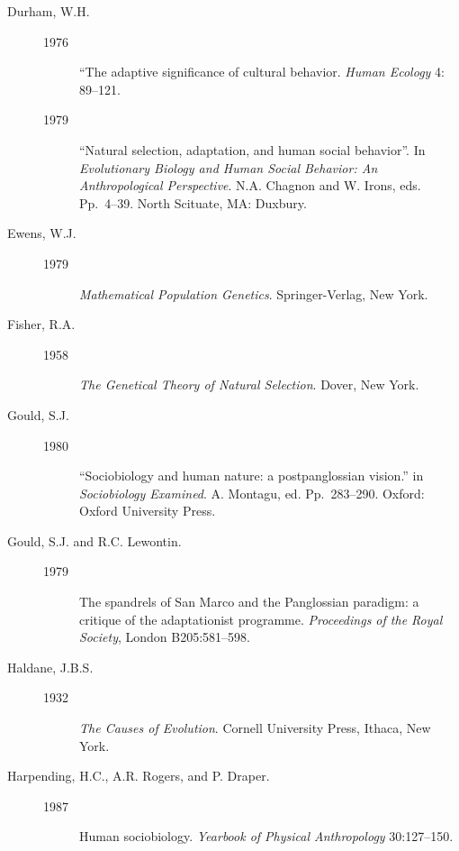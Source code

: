 \documentclass[11pt]{article}
\begin{document}
\begin{description}
\item[Durham, W.H.]
\mbox{}\begin{description}
\item[1976] ``The adaptive significance of cultural behavior.
\emph{Human Ecology} 4: 89--121.
\item[1979] ``Natural selection, adaptation, and human social
behavior''. In \emph{Evolutionary Biology and Human Social Behavior: An
Anthropological Perspective}. N.A. Chagnon and W. Irons, eds.
Pp.~4--39. North Scituate, MA: Duxbury.
\end{description}

\item[Ewens, W.J.]
\mbox{}\begin{description}
\item[1979] \emph{Mathematical Population Genetics}.
Springer-Verlag, New York.  
\end{description}

\item[Fisher, R.A.]
\mbox{}\begin{description}
\item[1958] \emph{The Genetical Theory of Natural Selection}.
Dover, New York.  
\end{description}

\item[Gould, S.J.]
\mbox{}\begin{description}
\item[1980] ``Sociobiology and human nature: a postpanglossian
vision.''  in \emph{Sociobiology Examined}. A. Montagu, ed. 
Pp.~283--290. Oxford: Oxford University Press.   
\end{description}

\item[Gould, S.J. and R.C. Lewontin.]
\mbox{}\begin{description}
\item[1979] The spandrels of San Marco and
the Panglossian paradigm: a critique of the adaptationist programme. {\em
Proceedings of the Royal Society}, London B205:581--598.  
\end{description}

\item[Haldane, J.B.S.]
\mbox{}\begin{description}
\item[1932] \emph{The Causes of Evolution}. Cornell
University Press, Ithaca, New York.   
\end{description}

\item[Harpending, H.C., A.R. Rogers, and P. Draper.]
\mbox{}\begin{description}
\item[1987] Human
sociobiology.  \emph{Yearbook of Physical Anthropology} 30:127--150.  
\end{description}


\end{description}
\end{document}

